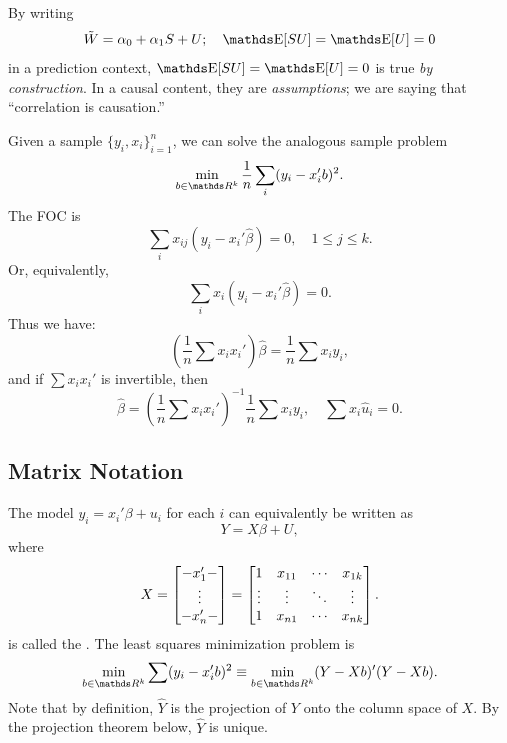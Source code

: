 \documentclass[letterpaper, 10pt]{article}
\begin{document}
\begin{remark}
  By writing
  \[
    \tilde{W} = \alpha_0 + \alpha_1 S + U; \quad
     \E[SU] = \E[U] = 0
  \]
  in a prediction context, \(\E[SU] = \E[U] = 0\) is true \emph{by construction}.
  In a causal content, they are \emph{assumptions}; we are saying that ``correlation is causation.''
\end{remark}


Given a sample \(\{y_i, x_i\}_{i = 1}^n\), we can solve the analogous sample problem
\[
  \min_{b \in \RR^k} \frac{1}{n} \sum_i (y_i - x_i' b)^2.
\]
The FOC is
\[
  \sum_{i} x_{ij} (y_i - x_i' \hat{\beta}) = 0, \quad 1 \leq j \leq k.
\]
Or, equivalently,
\[
  \sum_i x_i (y_i - x_i' \hat{\beta}) = 0.
\]
Thus we have:
\[
  \left( \frac{1}{n} \sum x_i x_i' \right) \hat{\beta}
  = \frac{1}{n} \sum x_i y_i,
\]
and if \(\sum x_i x_i'\) is invertible, then
\[
  \hat{\beta}
  = \left( \frac{1}{n} \sum x_i x_i' \right)^{-1} \frac{1}{n} \sum x_i y_i, \quad
  \sum x_i \hat{u}_i = 0.
\]

\subsection{Matrix Notation}
The model \(y_i = x_i' \beta + u_i\) for each \(i\) can  equivalently be written as
\[
  Y = X \beta + U,
\]
where
\[
  X = \begin{bmatrix}
    - x_1' - \\
    \vdots \\
    - x_n' -
  \end{bmatrix}
  = \begin{bmatrix}
    1 & x_{11} & \cdots & x_{1k} \\
    \vdots & \vdots & \ddots & \vdots \\
    1 & x_{n1} & \cdots & x_{nk}
  \end{bmatrix}.
\]
is called the .
The least squares minimization problem is
\[
  \min_{b \in \RR^k} \sum (y_i - x_i' b)^2
  \equiv \min_{b \in \RR^k} (Y - Xb)' (Y - Xb).
\]
Note that by definition, \(\hat{Y}\) is the projection of \(Y\) onto the column space of \(X\).
By the projection theorem below, \(\hat{Y}\) is unique.
\end{document}
